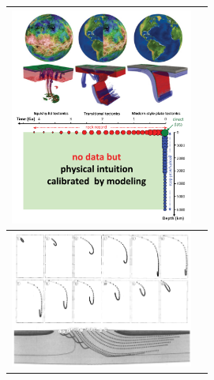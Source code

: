\begin{tabular}{p{8cm}p{8cm}}
\includegraphics[width=6cm]{images/beautiful/gery19} \cite{gery19}\\ \hline
\includegraphics[width=6cm]{images/beautiful/babr97} \cite{babr97} & \\ \hline
\end{tabular}



